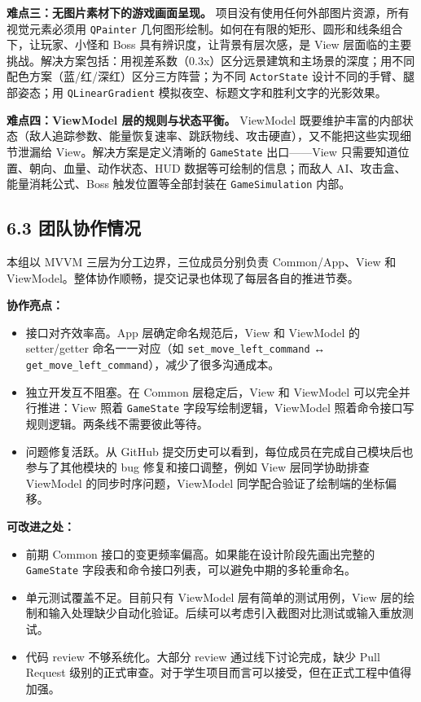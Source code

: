 \documentclass[12pt,fontset=none]{ctexart}
\begin{document}
\textbf{难点三：无图片素材下的游戏画面呈现。} 项目没有使用任何外部图片资源，所有视觉元素必须用 \texttt{QPainter} 几何图形绘制。如何在有限的矩形、圆形和线条组合下，让玩家、小怪和 Boss 具有辨识度，让背景有层次感，是 View 层面临的主要挑战。解决方案包括：用视差系数（0.3x）区分远景建筑和主场景的深度；用不同配色方案（蓝/红/深红）区分三方阵营；为不同 \texttt{ActorState} 设计不同的手臂、腿部姿态；用 \texttt{QLinearGradient} 模拟夜空、标题文字和胜利文字的光影效果。

\textbf{难点四：ViewModel 层的规则与状态平衡。} ViewModel 既要维护丰富的内部状态（敌人追踪参数、能量恢复速率、跳跃物线、攻击硬直），又不能把这些实现细节泄漏给 View。解决方案是定义清晰的 \texttt{GameState} 出口——View 只需要知道位置、朝向、血量、动作状态、HUD 数据等可绘制的信息；而敌人 AI、攻击盒、能量消耗公式、Boss 触发位置等全部封装在 \texttt{GameSimulation} 内部。


\subsection{6.3 团队协作情况}

本组以 MVVM 三层为分工边界，三位成员分别负责 Common/App、View 和 ViewModel。整体协作顺畅，提交记录也体现了每层各自的推进节奏。

\textbf{协作亮点：}

\begin{itemize}
\item 接口对齐效率高。App 层确定命名规范后，View 和 ViewModel 的 setter/getter 命名一一对应（如 \texttt{set\_move\_left\_command} ↔ \texttt{get\_move\_left\_command}），减少了很多沟通成本。
\item 独立开发互不阻塞。在 Common 层稳定后，View 和 ViewModel 可以完全并行推进：View 照着 \texttt{GameState} 字段写绘制逻辑，ViewModel 照着命令接口写规则逻辑。两条线不需要彼此等待。
\item 问题修复活跃。从 GitHub 提交历史可以看到，每位成员在完成自己模块后也参与了其他模块的 bug 修复和接口调整，例如 View 层同学协助排查 ViewModel 的同步时序问题，ViewModel 同学配合验证了绘制端的坐标偏移。
\end{itemize}

\textbf{可改进之处：}

\begin{itemize}
\item 前期 Common 接口的变更频率偏高。如果能在设计阶段先画出完整的 \texttt{GameState} 字段表和命令接口列表，可以避免中期的多轮重命名。
\item 单元测试覆盖不足。目前只有 ViewModel 层有简单的测试用例，View 层的绘制和输入处理缺少自动化验证。后续可以考虑引入截图对比测试或输入重放测试。
\item 代码 review 不够系统化。大部分 review 通过线下讨论完成，缺少 Pull Request 级别的正式审查。对于学生项目而言可以接受，但在正式工程中值得加强。
\end{itemize}
\end{document}
